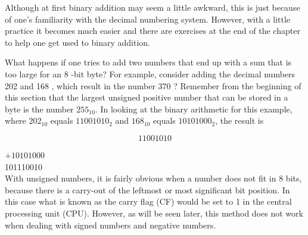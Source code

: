 \documentclass[10pt]{book}
\begin{document}
\begin{center}
\begin{center}
\begin{center}
\begin{center}
\begin{center}
Although at first binary addition may seem a little awkward, this is just because of one's familiarity with the decimal numbering system. However, with a little practice it becomes much easier and there are exercises at the end of the chapter to help one get used to binary addition.

What happens if one tries to add two numbers that end up with a sum that is too large for an 8 -bit byte? For example, consider adding the decimal numbers 202 and 168 , which result in the number 370 ? Remember from the beginning of this section that the largest unsigned positive number that can be stored in a byte is the number $255_{10}$. In looking at the binary arithmetic for this example, where $202_{10}$ equals $11001010_{2}$ and $168_{10}$ equals $10101000_{2}$, the result is

$$
11001010
$$

$+10101000$\\
101110010\\
With unsigned numbers, it is fairly obvious when a number does not fit in 8 bits, because there is a carry-out of the leftmost or most significant bit position. In this case what is known as the carry flag (CF) would be set to 1 in the central processing unit (CPU). However, as will be seen later, this method does not work when dealing with signed numbers and negative numbers.


\end{center}
\end{center}
\end{center}
\end{center}
\end{center}
\end{document}
